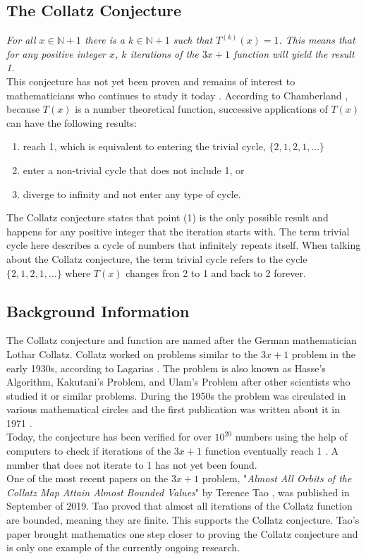 \documentclass[12pt,a4paper,reqno]{amsart}
\begin{document}
\subsection{The Collatz Conjecture}

\textit{For all $x \in \mathbb{N} + 1$ there is a $k \in \mathbb{N} + 1$ such 
that $T^{(k)}(x)=1$. This means that for any positive integer $x$, $k$ 
iterations of the $3x+1$ function will yield the result 1.} \\
This conjecture has not yet been proven and remains of interest to 
mathematicians who continues to study it today \cite{src:lagarias}. According 
to Chamberland \cite{src:chamberland}, because $T(x)$ is a number theoretical 
function, successive applications of $T(x)$ can have the following results:
\begin{enumerate}
    \item reach 1, which is equivalent to entering the trivial cycle,
        $\{2,1,2,1,\dots\}$
    \item enter a non-trivial cycle that does not include 1, or
    \item diverge to infinity and not enter any type of cycle.
\end{enumerate}
The Collatz conjecture states that point (1) is the only possible result and 
happens for any positive integer that the iteration starts with. The term 
trivial cycle here describes a cycle of numbers that infinitely repeats itself. 
When talking about the Collatz conjecture, the term trivial cycle refers to the 
cycle $\{2,1,2,1,\dots\}$ where $T(x)$ changes fron 2 to 1 and back to 2 
forever.

\subsection{Background Information}

The Collatz conjecture and function are named after the German mathematician
Lothar Collatz. Collatz worked on problems similar to the $3x+1$ problem in the
early 1930s, according to Lagarias \cite{src:lagarias}. The problem is also 
known as Hasse's Algorithm, Kakutani's Problem, and Ulam's Problem after other 
scientists who studied it or similar problems. During the 1950s the problem was 
circulated in various mathematical circles and the first publication was 
written about it in 1971 \cite{src:lagarias}. \\
Today, the conjecture has been verified for over $10^{20}$ numbers using the 
help of computers to check if iterations of the $3x+1$ function eventually
reach 1 \cite{src:tao}. A number that does not iterate to 1 has not yet been
found. \\
One of the most recent papers on the $3x+1$ problem, "\textit{Almost All Orbits
of the Collatz Map Attain Almost Bounded Values}" by Terence Tao 
\cite{src:tao}, was published in September of 2019. Tao proved that almost all 
iterations of the Collatz function are bounded, meaning they are finite. This 
supports the Collatz conjecture. Tao's paper brought mathematics one step 
closer to proving the Collatz conjecture and is only one example of the 
currently ongoing research.
\end{document}
